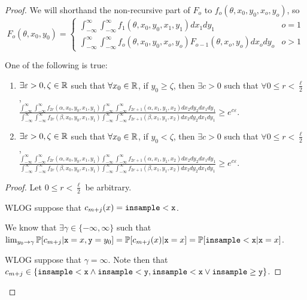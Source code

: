 \begin{proof}
	We will shorthand the non-recursive part of $F_o$ to $f_o(\theta, x_0, y_0, x_o, y_o)$, so
	\[
		F_o(\theta, x_0, y_0) = \begin{cases}
			\int_{-\infty}^\infty\int_{-\infty}^\infty f_1(\theta,x_0, y_0, x_1, y_1)dx_1dy_1 & o = 1\\
			\int_{-\infty}^\infty \int_{-\infty}^\infty f_o(\theta, x_0, y_0, x_o, y_o) F_{o-1}(\theta, x_o, y_o)dx_ody_o & o > 1
		\end{cases}	
	\]
	\begin{lemma}
		One of the following is true: \begin{enumerate}
			\item $\exists \varepsilon>0, \zeta\in \RR$ such that $\forall x_0\in \RR$, if $y_0\geq\zeta$, then $\exists c>0$ such that $\forall 0\leq r< \frac{\ell}{2}$, \\
			$\frac{\int_{-\infty}^\infty \int_{-\infty}^\infty f_{2r}(\alpha, x_0, y_0, x_1, y_1)\int_{-\infty}^\infty \int_{-\infty}^\infty f_{2r+1}(\alpha,x_1, y_1, x_2) dx_{2}dy_{2} dx_{1}dy_{1}}
			{\int_{-\infty}^\infty \int_{-\infty}^\infty f_{2r}(\beta, x_0, y_0, x_1, y_1)\int_{-\infty}^\infty \int_{-\infty}^\infty f_{2r+1}(\beta,x_1, y_1, x_2) dx_{2}dy_{2} dx_{1}dy_{1}}\geq e^{c\varepsilon}$.
			\item $\exists \varepsilon>0, \zeta\in \RR$ such that $\forall x_0\in \RR$, if $y_0<\zeta$, then $\exists c>0$ such that $\forall 0\leq r< \frac{\ell}{2}$, \\
			$\frac{\int_{-\infty}^\infty \int_{-\infty}^\infty f_{2r}(\alpha, x_0, y_0, x_1, y_1)\int_{-\infty}^\infty \int_{-\infty}^\infty f_{2r+1}(\alpha,x_1, y_1, x_2) dx_{2}dy_{2} dx_{1}dy_{1}}
			{\int_{-\infty}^\infty \int_{-\infty}^\infty f_{2r}(\beta, x_0, y_0, x_1, y_1)\int_{-\infty}^\infty \int_{-\infty}^\infty f_{2r+1}(\beta,x_1, y_1, x_2) dx_{2}dy_{2} dx_{1}dy_{1}}\geq e^{c\varepsilon}$.
		\end{enumerate}
	\end{lemma}
	\begin{proof}
		Let $0\leq r< \frac{\ell}{2}$ be arbitrary. 

		WLOG suppose that $c_{m+j}(x)=\lguard[\texttt{x}]$. 

		We know that $\exists \gamma \in \{-\infty, \infty\}$ such that $\lim_{y_0\to\gamma}\PP[c_{m+j}|\texttt{x}=x,\texttt{y}=y_0] = \PP[c_{m+j}(x)|\texttt{x}=x]=\PP[\lguard[\texttt{x}]|\texttt{x}=x]$.
		
		WLOG suppose that $\gamma = \infty$. Note then that $c_{m+j}\in \{\lguard[\texttt{x}]\land \lguard[\texttt{y}], \lguard[\texttt{x}]\lor \gguard[\texttt{y}]\}$.
		

\end{proof}
\end{proof}
